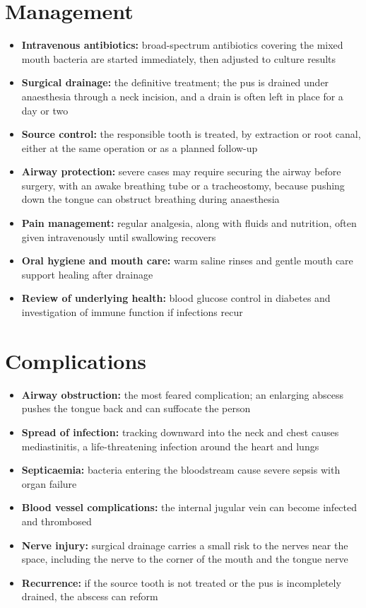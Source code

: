\section*{Management}
\begin{itemize}
    \item \textbf{Intravenous antibiotics:} broad-spectrum antibiotics covering the mixed mouth bacteria are started immediately, then adjusted to culture results
    \item \textbf{Surgical drainage:} the definitive treatment; the pus is drained under anaesthesia through a neck incision, and a drain is often left in place for a day or two
    \item \textbf{Source control:} the responsible tooth is treated, by extraction or root canal, either at the same operation or as a planned follow-up
    \item \textbf{Airway protection:} severe cases may require securing the airway before surgery, with an awake breathing tube or a tracheostomy, because pushing down the tongue can obstruct breathing during anaesthesia
    \item \textbf{Pain management:} regular analgesia, along with fluids and nutrition, often given intravenously until swallowing recovers
    \item \textbf{Oral hygiene and mouth care:} warm saline rinses and gentle mouth care support healing after drainage
    \item \textbf{Review of underlying health:} blood glucose control in diabetes and investigation of immune function if infections recur
\end{itemize}

\section*{Complications}
\begin{itemize}
    \item \textbf{Airway obstruction:} the most feared complication; an enlarging abscess pushes the tongue back and can suffocate the person
    \item \textbf{Spread of infection:} tracking downward into the neck and chest causes mediastinitis, a life-threatening infection around the heart and lungs
    \item \textbf{Septicaemia:} bacteria entering the bloodstream cause severe sepsis with organ failure
    \item \textbf{Blood vessel complications:} the internal jugular vein can become infected and thrombosed
    \item \textbf{Nerve injury:} surgical drainage carries a small risk to the nerves near the space, including the nerve to the corner of the mouth and the tongue nerve
    \item \textbf{Recurrence:} if the source tooth is not treated or the pus is incompletely drained, the abscess can reform
\end{itemize}

